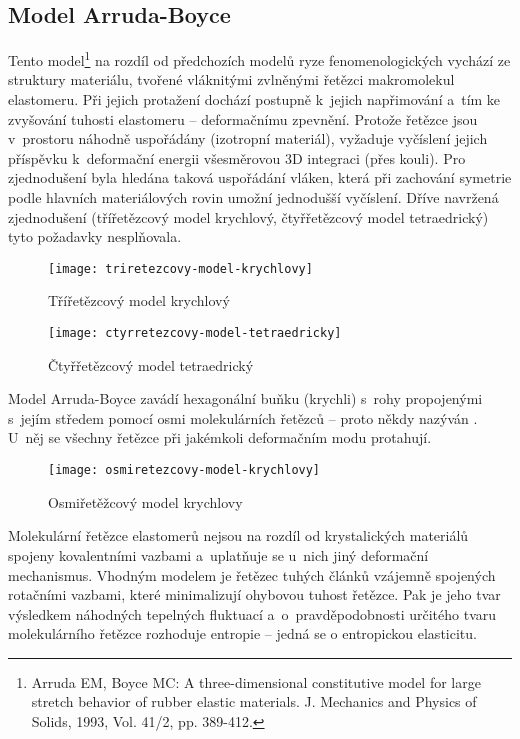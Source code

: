 
\subsection{Model Arruda-Boyce}\label{sec:arruda-boyce}
Tento model\footnote{Arruda EM, Boyce  MC: A three-dimensional constitutive model for large stretch behavior of rubber elastic materials. J. Mechanics and Physics of Solids, 1993, Vol. 41/2, pp. 389-412.} na rozdíl od předchozích modelů ryze fenomenologických vychází ze struktury materiálu, tvořené vláknitými zvlněnými řetězci makromolekul elastomeru.
Při jejich protažení dochází postupně k~jejich napřimování a~tím ke zvyšování tuhosti elastomeru -- deformačnímu zpevnění.
Protože řetězce jsou v~prostoru náhodně uspořádány (izotropní materiál), vyžaduje vyčíslení jejich příspěvku k~deformační energii všesměrovou 3D integraci (přes kouli).
Pro zjednodušení byla hledána taková uspořádání vláken, která při zachování symetrie podle hlavních materiálových rovin umožní jednodušší vyčíslení.
Dříve navržená zjednodušení (třířetězcový model krychlový, čtyřřetězcový model tetraedrický) tyto požadavky nesplňovala.

\begin{figure}[H]
	\centering
	\texttt{[image: triretezcovy-model-krychlovy]}
	\caption{Třířetězcový model krychlový}
	\label{fig:triretezcovy-model-krychlovy}
\end{figure}

\begin{figure}[H]
	\centering
	\texttt{[image: ctyrretezcovy-model-tetraedricky]}
	\caption{Čtyřřetězcový model tetraedrický}
	\label{fig:ctyrretezcovy-model-tetraedricky}
\end{figure}

Model Arruda-Boyce zavádí hexagonální buňku (krychli) s~rohy propojenými s~jejím středem pomocí osmi molekulárních řetězců -- proto někdy nazýván . U~něj se všechny řetězce při jakémkoli deformačním modu protahují.

\begin{figure}[H]
	\centering
	\texttt{[image: osmiretezcovy-model-krychlovy]}
	\caption{Osmiřetěžcový model krychlovy}
	\label{fig:osmiretezcovy-model-krychlovy}
\end{figure}

Molekulární řetězce elastomerů nejsou na rozdíl od krystalických materiálů spojeny kovalentními vazbami a~uplatňuje se u~nich jiný deformační mechanismus.
Vhodným modelem je řetězec tuhých článků vzájemně spojených rotačními vazbami, které minimalizují ohybovou tuhost řetězce.
Pak je jeho tvar výsledkem náhodných tepelných fluktuací a~o~pravděpodobnosti určitého tvaru molekulárního řetězce rozhoduje entropie -- jedná se o entropickou elasticitu.

